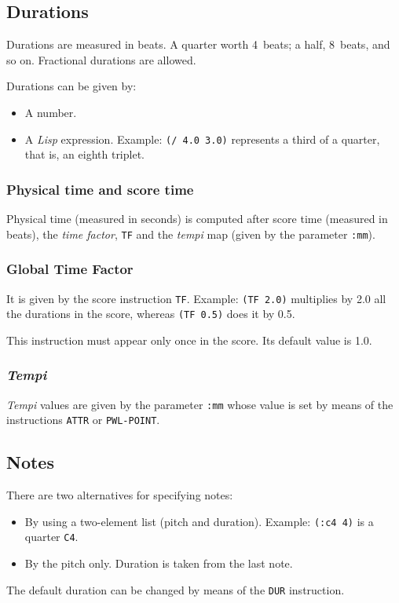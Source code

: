 \subsection{Durations}\label{duraciones}
Durations are measured in beats. A quarter worth 4~beats; a half, 8~beats, and so on. Fractional durations are allowed.\par
Durations can be given by:
\begin{itemize}
  \item A number.
  \item A \textit{Lisp} expression. Example: \texttt{(/ 4.0 3.0)} represents a third of a quarter, that is, an eighth triplet.
\end{itemize}


\subsubsection*{Physical time and score time}
Physical time (measured in seconds) is computed after score time (measured in beats), the \textit{time factor}, \texttt{TF} and the \textit{tempi} map (given by the parameter \texttt{:mm}).

\subsubsection*{Global Time Factor}
It is given by the score instruction \texttt{TF}.  Example: \texttt{(TF 2.0)} multiplies by 2.0 all the durations in the score, whereas \texttt{(TF 0.5)} does it by 0.5. \par
This instruction must appear only once in the score. Its default value is 1.0.
\subsubsection*{\textit{Tempi}}
\textit{Tempi} values are given by the parameter \texttt{:mm} whose value is set by means of the instructions \texttt{ATTR} or \texttt{PWL-POINT}.
\subsection{Notes}
There are two alternatives for specifying notes: 
\begin{itemize}
 \item By using a two-element list (pitch and duration). Example: \texttt{(:c4 4)} is a quarter \texttt{C4}.
 \item By the pitch only. Duration is taken from the last note.
\end{itemize}
The default duration can be changed by means of the \texttt{DUR} instruction.

